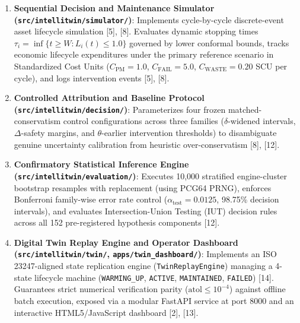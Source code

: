 \documentclass[12pt,a4paper]{article}
\begin{document}
\begin{enumerate}
\begin{equation}
    a(\hat{p}) = \sigma(\hat{p}) \cdot \exp(\beta \cdot z(\hat{p})), \quad b(\hat{p}) = \sigma(\hat{p}) \cdot \exp(-\beta \cdot z(\hat{p}))
    \end{equation}
    \begin{equation}
    s_i(t) = \max\left( \frac{\hat{p}_i(t) - y_i(t)}{a(\hat{p}_i(t))}, \frac{y_i(t) - \hat{p}_i(t)}{b(\hat{p}_i(t))}, 0 \right)
    \end{equation}
    Calibration quantiles place finite probability mass $\frac{m}{m+1}$ with point-at-infinity mass $\frac{1}{m+1}$, targeting nominal $1 - \alpha = 0.90$ coverage with automatic global fallback routing for regime clusters containing fewer than $m_g \ge 10$ calibration units [9].
    \item \textbf{Sequential Decision and Maintenance Simulator (\texttt{src/intellitwin/simulator/})}: Implements cycle-by-cycle discrete-event asset lifecycle simulation [5], [8]. Evaluates dynamic stopping times $\tau_i = \inf \{ t \ge W : L_i(t) \le 1.0 \}$ governed by lower conformal bounds, tracks economic lifecycle expenditures under the primary reference scenario in Standardized Cost Units ($C_{\text{PM}} = 1.0$, $C_{\text{FAIL}} = 5.0$, $C_{\text{WASTE}} = 0.20$ SCU per cycle), and logs intervention events [5], [8].
    \item \textbf{Controlled Attribution and Baseline Protocol (\texttt{src/intellitwin/decision/})}: Parameterizes four frozen matched-conservatism control configurations across three families ($\delta$-widened intervals, $\Delta$-safety margins, and $\theta$-earlier intervention thresholds) to disambiguate genuine uncertainty calibration from heuristic over-conservatism [8], [12].
    \item \textbf{Confirmatory Statistical Inference Engine (\texttt{src/intellitwin/evaluation/})}: Executes 10,000 stratified engine-cluster bootstrap resamples with replacement (using PCG64 PRNG), enforces Bonferroni family-wise error rate control ($\alpha_{\text{test}} = 0.0125$, 98.75\% decision intervals), and evaluates Intersection-Union Testing (IUT) decision rules across all 152 pre-registered hypothesis components [12].
    \item \textbf{Digital Twin Replay Engine and Operator Dashboard (\texttt{src/intellitwin/twin/}, \texttt{apps/twin_dashboard/})}: Implements an ISO 23247-aligned state replication engine (\texttt{TwinReplayEngine}) managing a 4-state lifecycle machine (\texttt{WARMING\_UP}, \texttt{ACTIVE}, \texttt{MAINTAINED}, \texttt{FAILED}) [14]. Guarantees strict numerical verification parity ($\text{atol} \le 10^{-4}$) against offline batch execution, exposed via a modular FastAPI service at port 8000 and an interactive HTML5/JavaScript dashboard [2], [13].
\end{enumerate}
\end{document}
